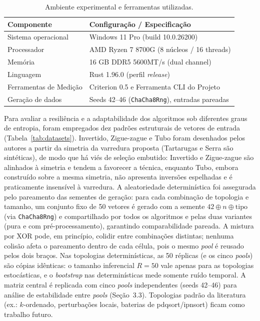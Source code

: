 \documentclass[portuguese]{sbc2025}%
\begin{document}
\begin{table}[htbp]
\centering
\caption{Ambiente experimental e ferramentas utilizadas.}
\label{tab:ambiente}
\begin{tabularx}{\columnwidth}{@{}lX@{}}
\hline
\textbf{Componente} & \textbf{Configuração / Especificação} \\
\hline
Sistema operacional & Windows 11 Pro (build 10.0.26200) \\
Processador & AMD Ryzen 7 8700G (8 núcleos / 16 threads) \\
Memória & 16 GB DDR5 5600MT/s (dual channel) \\
Linguagem & Rust 1.96.0 (perfil \emph{release}) \\
Ferramentas de Medição & Criterion 0.5 e Ferramenta CLI do Projeto \\
Geração de dados & Seeds 42--46 (\texttt{ChaCha8Rng}), entradas pareadas \\
\hline
\end{tabularx}
\end{table}

Para avaliar a resiliência e a adaptabilidade dos algoritmos sob diferentes graus de entropia, foram empregados dez padrões estruturais de vetores de entrada (Tabela~\ref{tab:datasets}). Invertido, Zigue-zague e Tubo foram desenhados pelos autores a partir da simetria da varredura proposta (Tartarugas e Serra são sintéticas), de modo que há viés de seleção embutido: Invertido e Zigue-zague são alinhados à simetria e tendem a favorecer a técnica, enquanto Tubo, embora construído sobre a mesma simetria, não apresenta inversões espelhadas e é praticamente insensível à varredura. A aleatoriedade determinística foi assegurada pelo pareamento das sementes de geração: para cada combinação de topologia e tamanho, um conjunto fixo de 50 vetores é gerado com a semente $42 \oplus n \oplus \text{tipo}$ (via \texttt{ChaCha8Rng}) e compartilhado por todos os algoritmos e pelas duas variantes (pura e com pré-processamento), garantindo comparabilidade pareada. A mistura por XOR pode, em princípio, colidir entre combinações distintas; nenhuma colisão afeta o pareamento dentro de cada célula, pois o mesmo \emph{pool} é reusado pelos dois braços. Nas topologias determinísticas, as 50 réplicas (e os cinco \emph{pools}) são cópias idênticas: o tamanho inferencial $R{=}50$ vale apenas para as topologias estocásticas, e o \emph{bootstrap} nas determinísticas mede somente ruído temporal. A matriz central é replicada com cinco \emph{pools} independentes (seeds 42--46) para análise de estabilidade entre \emph{pools} (Seção~3.3). Topologias padrão da literatura (ex.: $k$-ordenado, perturbações locais, baterias de pdqsort/ipnsort) ficam como trabalho futuro.
\end{document}
